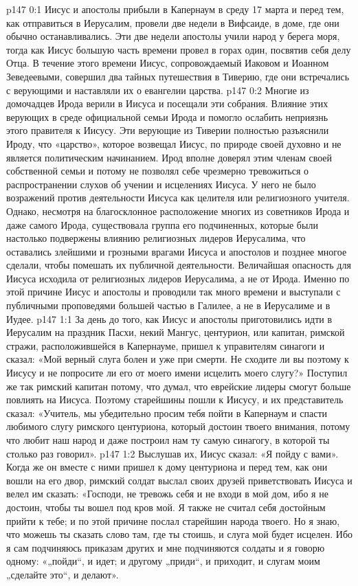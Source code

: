 \author{Комиссия срединников}
\vs p147 0:1 Иисус и апостолы прибыли в Капернаум в среду 17 марта и перед тем, как отправиться в Иерусалим, провели две недели в Вифсаиде, в доме, где они обычно останавливались. Эти две недели апостолы учили народ у берега моря, тогда как Иисус большую часть времени провел в горах один, посвятив себя делу Отца. В течение этого времени Иисус, сопровождаемый Иаковом и Иоанном Зеведеевыми, совершил два тайных путешествия в Тиверию, где они встречались с верующими и наставляли их о евангелии царства.
\vs p147 0:2 Многие из домочадцев Ирода верили в Иисуса и посещали эти собрания. Влияние этих верующих в среде официальной семьи Ирода и помогло ослабить неприязнь этого правителя к Иисусу. Эти верующие из Тиверии полностью разъяснили Ироду, что «царство», которое возвещал Иисус, по природе своей духовно и не является политическим начинанием. Ирод вполне доверял этим членам своей собственной семьи и потому не позволял себе чрезмерно тревожиться о распространении слухов об учении и исцелениях Иисуса. У него не было возражений против деятельности Иисуса как целителя или религиозного учителя. Однако, несмотря на благосклонное расположение многих из советников Ирода и даже самого Ирода, существовала группа его подчиненных, которые были настолько подвержены влиянию религиозных лидеров Иерусалима, что оставались злейшими и грозными врагами Иисуса и апостолов и позднее многое сделали, чтобы помешать их публичной деятельности. Величайшая опасность для Иисуса исходила от религиозных лидеров Иерусалима, а не от Ирода. Именно по этой причине Иисус и апостолы и проводили так много времени и выступали с публичными проповедями большей частью в Галилее, а не в Иерусалиме и в Иудее.
\vs p147 1:1 За день до того, как Иисус и апостолы приготовились идти в Иерусалим на праздник Пасхи, некий Мангус, центурион, или капитан, римской стражи, расположившейся в Капернауме, пришел к управителям синагоги и сказал: «Мой верный слуга болен и уже при смерти. Не сходите ли вы поэтому к Иисусу и не попросите ли его от моего имени исцелить моего слугу?» Поступил же так римский капитан потому, что думал, что еврейские лидеры смогут больше повлиять на Иисуса. Поэтому старейшины пошли к Иисусу, и их представитель сказал: «Учитель, мы убедительно просим тебя пойти в Капернаум и спасти любимого слугу римского центуриона, который достоин твоего внимания, потому что любит наш народ и даже построил нам ту самую синагогу, в которой ты столько раз говорил».
\vs p147 1:2 Выслушав их, Иисус сказал: «Я пойду с вами». Когда же он вместе с ними пришел к дому центуриона и перед тем, как они вошли на его двор, римский солдат выслал своих друзей приветствовать Иисуса и велел им сказать: «Господи, не тревожь себя и не входи в мой дом, ибо я не достоин, чтобы ты вошел под кров мой. Я также не считал себя достойным прийти к тебе; и по этой причине послал старейшин народа твоего. Но я знаю, что можешь ты сказать слово там, где ты стоишь, и слуга мой будет исцелен. Ибо я сам подчиняюсь приказам других и мне подчиняются солдаты и я говорю одному: «„пойди“, и идет; и другому „приди“, и приходит, и слугам моим „сделайте это“, и делают».
